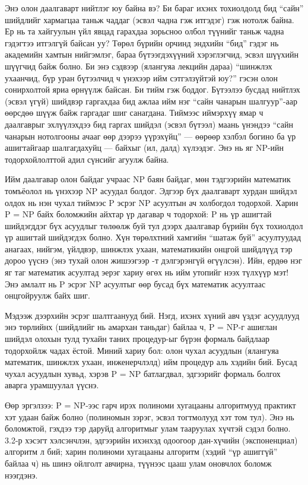 Энэ олон даалгаварт нийтлэг юу байна вэ? Би бараг ихэнх тохиолдолд бид “сайн” шийдлийг хармагцаа таньж чаддаг (эсвэл чадна гэж итгэдэг) гэж нотолж байна. Ер нь та хайгуулын үйл явцад гарахдаа зорьсноо олбол түүнийг таньж чадна гэдэгтээ итгэлгүй байсан уу? Төрөл бүрийн орчинд эндхийн “бид” гэдэг нь академийн хамтын нийгэмлэг, бараа бүтээгдэхүүний хэрэглэгчид, эсвэл шүүхийн шүүгчид байж болно. Би энэ сэдвээр (ялангуяа лекцийн дараа) “шинжлэх ухаанчид, бүр уран бүтээлчид ч үнэхээр ийм сэтгэлзүйтэй юу?” гэсэн олон сонирхолтой яриа өрнүүлж байсан. Би тийм гэж боддог. Бүтээлээ бусдад нийтлэх (эсвэл үгүй) шийдвэр гаргахдаа бид ажлаа ийм нэг “сайн чанарын шалгуур”-аар өөрсдөө шүүж байж гаргадаг шиг санагдана. Тиймээс иймэрхүү ямар ч даалгаврыг эхлүүлэхдээ бид гаргах шийдэл (эсвэл бүтээл) маань үнэндээ “сайн чанарын нотолгооны ачааг өөр дээрээ үүрэхүйц” — өөрөөр хэлбэл богино ба үр ашигтайгаар шалгагдахуйц — байхыг (ил, далд) хүлээдэг. Энэ нь яг NP-ийн тодорхойлолттой адил сүнсийг агуулж байна.


Ийм даалгавар олон байдаг учраас NP баян байдаг, мөн тэдгээрийн математик томъёолол нь үнэхээр NP асуудал болдог. Эдгээр бүх даалгаварт хурдан шийдэл олдох нь нэн чухал тиймээс P эсрэг NP асуултын ач холбогдол тодорхой. Харин P = NP байх боломжийн айхтар үр дагавар ч тодорхой: P нь үр ашигтай шийдэгддэг бүх асуудлыг төлөөлж буй тул дээрх даалгавар бүрийн бүх тохиолдол үр ашигтай шийдэгдэх болно. Хүн төрөлхтний хамгийн “шатаж буй” асуултуудад анагаах, нийгэм, үйлдвэр, шинжлэх ухаан, математикийн онцгой шийдлүүд тэр дороо үүснэ (энэ тухай олон жишээгээр \cite{For13}-т дэлгэрэнгүй өгүүлсэн). Ийн, ердөө нэг яг таг математик асуултад эерэг хариу өгөх нь ийм утопийг нээх түлхүүр мэт! Энэ амлалт нь P эсрэг NP асуултыг өөр бусад бүх математик асуултаас онцгойруулж байх шиг.


Мэдээж дээрхийн эсрэг шалтгаанууд бий. Нэгд, ихэнх хүний авч үздэг асуудлууд энэ төрлийнх (шийдлийг нь амархан таньдаг) байлаа ч, P = NP-г ашиглан шийдэл олохын тулд тухайн таних процедур-ыг бүрэн формаль байдлаар тодорхойлж чадах ёстой. Миний хариу бол: олон чухал асуудлын (ялангуяа математик, шинжлэх ухаан, инженерчлэлд) ийм процедур аль хэдийн бий. Бусад чухал асуудлын хувьд, хэрэв P = NP батлагдвал, эдгээрийг формаль болгох аварга урамшуулал үүснэ.


Өөр эргэлзээ: P = NP-ээс гарч ирэх полиноми хугацааны алгоритмууд практикт хэт удаан байж болно (полиномын зэрэг, эсвэл тогтмолууд хэт том тул). Энэ нь боломжтой, гэхдээ тэр даруйд алгоритмыг улам тааруулах хүчтэй сэдэл болно. 3.2-р хэсэгт хэлсэнчлэн, эдгээрийн ихэнхэд одоогоор дан-хүчийн (экспоненциал) алгоритм л бий; харин полиноми хугацааны алгоритм (хэдий “үр ашиггүй” байлаа ч) нь шинэ ойлголт авчирна, түүнээс цааш улам оновчлох боломж нээгдэнэ.


